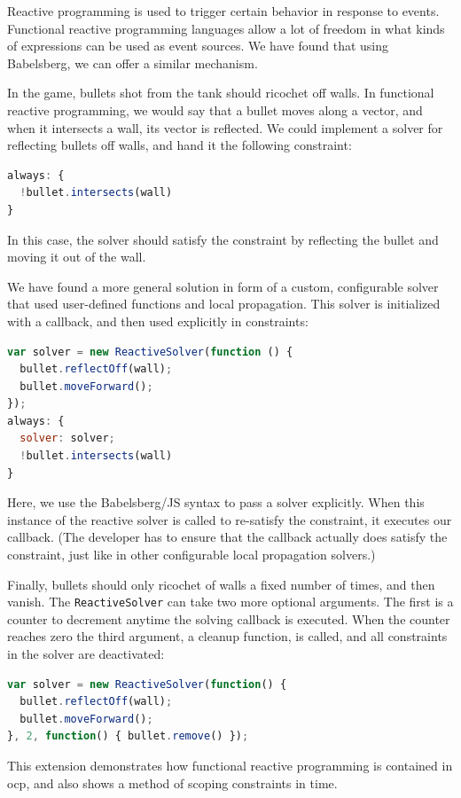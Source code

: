 Reactive programming is used to trigger certain behavior in response to
events. Functional reactive programming languages allow a lot of freedom in what
kinds of expressions can be used as event sources. We have found that using
Babelsberg, we can offer a similar mechanism.

In the game, bullets shot from the tank should ricochet off walls. In functional
reactive programming, we would say that a bullet moves along a vector, and when
it intersects a wall, its vector is reflected. We could implement a solver for
reflecting bullets off walls, and hand it the following constraint:
\begin{lstlisting}[language=JavaScript]
always: {
  !bullet.intersects(wall)
}
\end{lstlisting}
In this case, the solver should satisfy the constraint by reflecting the bullet
and moving it out of the wall.

We have found a more general solution in form of a custom, configurable solver
that used user-defined functions and local propagation. This solver is
initialized with a callback, and then used explicitly in constraints:
\begin{lstlisting}[language=JavaScript]
var solver = new ReactiveSolver(function () {
  bullet.reflectOff(wall);
  bullet.moveForward();
});
always: {
  solver: solver;
  !bullet.intersects(wall)
}
\end{lstlisting}
Here, we use the Babelsberg/JS syntax to pass a solver explicitly. When this
instance of the reactive solver is called to re-satisfy the constraint, it
executes our callback. (The developer has to ensure that the callback actually
does satisfy the constraint, just like in other configurable local propagation
solvers.)

Finally, bullets should only ricochet of walls a fixed number of times, and then
vanish. The \lstinline{ReactiveSolver} can take two more optional
arguments. The first is a counter to decrement anytime the solving callback is
executed. When the counter reaches zero the third argument, a cleanup function,
is called, and all constraints in the solver are deactivated:
\begin{lstlisting}[language=JavaScript]
var solver = new ReactiveSolver(function() {
  bullet.reflectOff(wall);
  bullet.moveForward();
}, 2, function() { bullet.remove() });
\end{lstlisting}

This extension demonstrates how functional reactive programming is contained in
\ac{ocp}, and also shows a method of scoping constraints in time.

